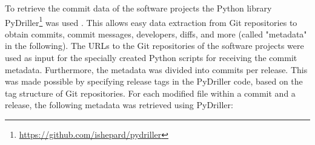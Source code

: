 \begin{table}[t]
\centering
\caption{Subject systems }
\label{tab:tools}
\end{table}

To retrieve the commit data of the software projects the Python library PyDriller\footnote{\href{https://github.com/ishepard/pydriller}{https://github.com/ishepard/pydriller}} was used \cite{Spadini2018}. This allows easy data extraction from Git repositories to obtain commits, commit messages, developers, diffs, and more (called "metadata" in the following). The URLs to the Git repositories of the software projects were used as input for the specially created Python scripts for receiving the commit metadata. Furthermore, the metadata was divided into commits per release. This was made possible by specifying release tags in the PyDriller code, based on the tag structure of Git repositories. For each modified file within a commit and a release, the following metadata was retrieved using PyDriller:

